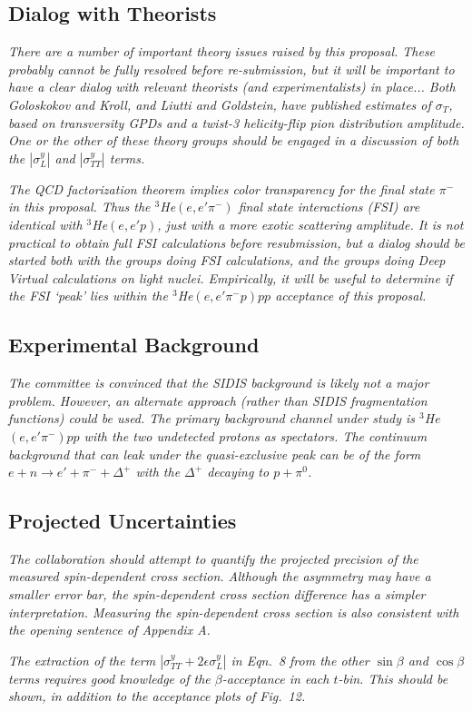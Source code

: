 \subsection{Dialog with Theorists}

{\it There are a number of important theory issues raised by this proposal.
  These probably cannot be fully resolved before re-submission, but it will be
  important to have a clear dialog with relevant theorists (and
  experimentalists) in place...  Both Goloskokov and Kroll, and Liutti and
  Goldstein, have published estimates of $\sigma_T$, based on transversity GPDs
  and a twist-3 helicity-flip pion distribution amplitude.  One or the other of
  these theory groups should be engaged in a discussion of both the
  $|\sigma^y_L|$ and $|\sigma^y_{TT}|$ terms.}

{\it The QCD factorization theorem implies color transparency for the final
  state $\pi^-$ in this proposal.  Thus the $^3$He$(e,e'\pi^-)$ final state 
  interactions (FSI) are identical with $^3$He$(e,e'p)$, just with a more exotic
  scattering amplitude.  It is not practical to obtain full FSI calculations
  before resubmission, but a dialog should be started both with the groups
  doing FSI calculations, and the groups doing Deep Virtual calculations on
  light nuclei.  Empirically, it will be useful to determine if the FSI `peak'
  lies within the $^3$He$(e,e'\pi^-p)pp$ acceptance of this proposal.}

\subsection{Experimental Background}

{\it The committee is convinced that the SIDIS background is likely not a
  major problem.  However, an alternate approach (rather than SIDIS
  fragmentation functions) could be used.  The primary background channel under
  study is $^3$He$(e,e'\pi^-)pp$ with the two undetected protons as
  spectators.  The continuum background that can leak under the quasi-exclusive
  peak can be of the form $e+n\rightarrow e'+\pi^-+\Delta^+$ with the
  $\Delta^+$ decaying to $p+\pi^0$.}

\subsection{Projected Uncertainties}

{\it The collaboration should attempt to quantify the projected precision of
  the measured spin-dependent cross section.  Although the asymmetry may have a
  smaller error bar, the spin-dependent cross section difference has a simpler
  interpretation.  Measuring the spin-dependent cross section is also
  consistent with the opening sentence of Appendix A.}

{\it The extraction of the term $|\sigma^y_{TT}+2\epsilon\sigma^y_L|$ in
  Eqn.~8 from the other $\sin\beta$ and $\cos\beta$ terms requires good
  knowledge of the $\beta$-acceptance in each $t$-bin.  This should be shown,
  in addition to the acceptance plots of Fig.~12.}
